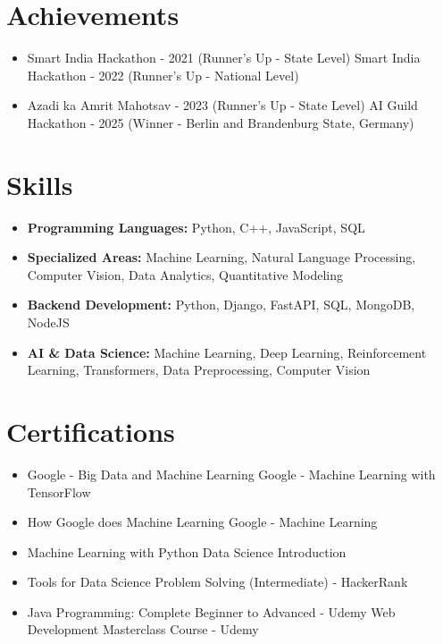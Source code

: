 \documentclass[a4paper,10pt]{article}
\begin{document}
\section*{Achievements}
\begin{itemize}
\item Smart India Hackathon - 2021 (Runner's Up - State Level) \hfill Smart India Hackathon - 2022 (Runner's Up - National Level)
\item Azadi ka Amrit Mahotsav - 2023 (Runner's Up - State Level) \hfill AI Guild Hackathon - 2025 (Winner - Berlin and Brandenburg State, Germany)
\end{itemize}

\section*{Skills}
\begin{itemize}
  \item \textbf{Programming Languages:} Python, C++, JavaScript, SQL
  \item \textbf{Specialized Areas:} Machine Learning, Natural Language Processing, Computer Vision, Data Analytics, Quantitative Modeling
  \item \textbf{Backend Development:} Python, Django, FastAPI, SQL, MongoDB, NodeJS
  \item \textbf{AI \& Data Science:} Machine Learning, Deep Learning, Reinforcement Learning, Transformers, Data Preprocessing, Computer Vision
\end{itemize}

\section*{Certifications}
\begin{itemize}
\item Google - Big Data and Machine Learning \hfill Google - Machine Learning with TensorFlow
\item How Google does Machine Learning \hfill Google - Machine Learning
\item Machine Learning with Python \hfill Data Science Introduction
\item Tools for Data Science \hfill Problem Solving (Intermediate) - HackerRank
\item Java Programming: Complete Beginner to Advanced - Udemy \hfill Web Development Masterclass Course - Udemy
\end{itemize}
\end{document}
